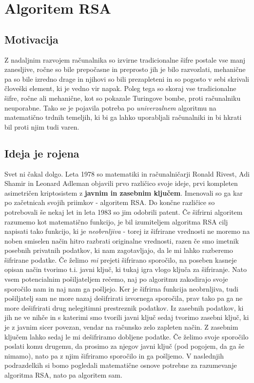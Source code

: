 \documentclass[a4paper, 12pt]{article} %
\begin{document}
\newpage
\section{Algoritem RSA}

\subsection{Motivacija}

Z nadaljnim razvojem računalnika so izvirne tradicionalne šifre postale vse manj zanesljive, ročne so bile prepočasne in preprosto jih je bilo razvozlati, mehanične pa so bile izredno drage in njihovi so bili prezapleteni in so pogosto v sebi skrivali človeški element, ki je vedno vir napak. Poleg tega so skoraj vse tradicionalne šifre, ročne ali mehanične, kot so pokazale Turingove bombe, proti računalniku neuporabne. Tako se je pojavila potreba po \emph{univerzalnem} algoritmu na matematično trdnih temeljih, ki bi ga lahko uporabljali računalniki in bi hkrati bil proti njim tudi varen.

\subsection{Ideja je rojena}

Svet ni čakal dolgo. Leta 1978 so matematiki in računalničarji Ronald Rivest, Adi Shamir in Leonard Adleman objavili prvo različico svoje ideje, prvi kompleten asimetričen kriptosistem z \textbf{javnim in zasebnim ključem}. Imenovali so ga kar po začetnicah svojih priimkov - algoritem RSA. Do končne različice so potrebovali še nekaj let in leta 1983 so jim odobrili patent.
\newline
\newline
Če šifrirni algoritem razumemo kot matematično funkcijo, je bil izumiteljem algoritma RSA cilj napisati tako funkcijo, ki je \emph{neobrnljiva} - torej iz šifrirane vrednosti ne moremo na noben smiselen način hitro razbrati originalne vrednosti, razen če smo imetnik posebnih privatnih podatkov, ki nam zagotavljajo, da le mi lahko razberemo šifrirane podatke. Če želimo \emph{mi} prejeti šifrirano sporočilo, na poseben kasneje opisan način tvorimo t.i. javni ključ, ki tukaj igra vlogo ključa za šifriranje. Nato vsem potencialnim pošiljateljem rečemo, naj po algoritmu zakodirajo svoje sporočilo nam in naj nam ga pošljejo. Ker je šifrirna funkcija neobrnljiva, tudi pošiljatelj sam ne more nazaj dešifrirati izvornega sporočila, prav tako pa ga ne more dešifrirati drug nelegitimni prestreznik podatkov. Iz zasebnih podatkov, ki jih ne ve nihče in s katerimi smo tvorili javni ključ sedaj tvorimo zasebni ključ, ki je z javnim sicer povezan, vendar na računsko zelo zapleten način. Z zasebnim ključem lahko sedaj le mi dešifriramo dobljene podatke. Če želimo svoje sporočilo poslati komu drugemu, da prosimo za njegov javni ključ (pod pogojem, da ga še nimamo), nato pa z njim šifriramo sporočilo in ga pošljemo.
\newline
\newline
V naslednjih podrazdelkih si bomo pogledali matematične osnove potrebne za razumevanje algoritma RSA, nato pa algoritem sam.
\end{document}

